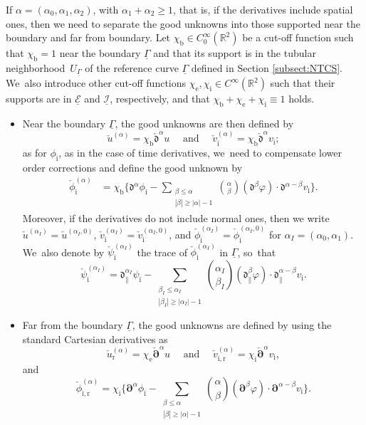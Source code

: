 \documentclass[11pt]{article}
\newcommand{\R}{{\mathbb R}}
\newcommand{\cI}{{\mathcal I}}
\newcommand{\cE}{{\mathcal E}}
\newcommand{\ul}[1]{\underline{#1}}
\newcommand{\itGamma}{\mathit{\Gamma}}
\newcommand{\cpalpha}{\check{\bm{\partial}}^{\alpha} }
\newcommand{\cmfalpha}{\check{\mathfrak{d}}^{\alpha}}
\theoremstyle{definition}
\begin{document}
If $\alpha=(\alpha_0,\alpha_1,\alpha_2)$, with $\alpha_1+\alpha_2\geq 1$, that is, if the derivatives include spatial ones,
then we need to separate the good unknowns into those supported near the boundary and far from boundary.
Let $\chi_\mathrm{b}\in C_0^\infty(\R^2)$ be a cut-off function such that $\chi_\mathrm{b}=1$ near the boundary $\ul{\itGamma}$ and that its support is in the
tubular neighborhood~$U_{\ul{\itGamma}}$ of the reference curve $\ul{\itGamma}$ defined in Section \ref{subsect:NTCS}. We~also introduce other cut-off functions $\chi_\mathrm{e},\chi_\mathrm{i}\in C^\infty(\R^2)$ such that their supports are in $\ul{\cE}$ and $\ul{\cI}$, respectively,
and that $\chi_\mathrm{b}+\chi_\mathrm{e}+\chi_\mathrm{i}\equiv1$ holds.
\begin{itemize}
\item
Near the boundary $\ul{\itGamma}$, the good unknowns are then defined by
\[
\check{u}^{(\alpha)} = \chi_\mathrm{b} \cmfalpha u
\quad\mbox{ and }\quad
\check{v}_\mathrm{i}^{(\alpha)} = \chi_\mathrm{b} \cmfalpha v_\mathrm{i};
\]
as for $\phi_\mathrm{i}$, as in the case of time derivatives, we~need to compensate lower order corrections and define the good unknown by
\begin{align*}
\check{\phi}_\mathrm{i}^{(\alpha)}
&= \chi_\mathrm{b} \biggl\{ \mathfrak{d}^{\alpha}\phi_\mathrm{i} - \sum_{\substack{\beta\leq\alpha\\ |\beta|\geq|\alpha|-1}} \binom{\alpha}{\beta}
(\mathfrak{d}^{\beta}\varphi)\cdot \mathfrak{d}^{\alpha-\beta}v_\mathrm{i} \biggr\}.
\end{align*}
Moreover, if the derivatives do not include normal ones, then we write $\check{u}^{(\alpha_I)}=\check{u}^{(\alpha_I,0)}$,
$\check{v}_\mathrm{i}^{(\alpha_I)}=\check{v}_\mathrm{i}^{(\alpha_I,0)}$,
and $\check{\phi}_\mathrm{i}^{(\alpha_I)}=\check{\phi}_\mathrm{i}^{(\alpha_I,0)}$ for $\alpha_I=(\alpha_0,\alpha_1)$. We~also denote by $\check\psi_\mathrm{i}^{(\alpha_{I})}$ the trace of $\check{\phi}_\mathrm{i}^{(\alpha_I)}$ in $\ul{\itGamma}$, so~that
\[
\check\psi_\mathrm{i}^{(\alpha_{I})}=\mathfrak{d}_\parallel^{\alpha_{I}}\psi_\mathrm{i} - \sum_{\substack{\beta_I\leq\alpha_I\\ |\beta_I|\geq|\alpha_I|-1}} \binom{\alpha_I}{\beta_I}
(\mathfrak{d}_\parallel^{\beta}\varphi)\cdot \mathfrak{d}_\parallel^{\alpha-\beta}v_\mathrm{i}.
\]
\item
Far from the boundary $\ul{\itGamma}$, the good unknowns are defined by using the standard Cartesian derivatives as
\[
\check{u}_\mathrm{r}^{(\alpha)} = \chi_\mathrm{e} \cpalpha u
\quad\mbox{ and }\quad
\check{v}_\mathrm{i,r}^{(\alpha)} = \chi_\mathrm{i}\cpalpha v_\mathrm{i},
\]
and
\[
\check{\phi}_\mathrm{i,r}^{(\alpha)}
= \chi_\mathrm{i} \biggl\{ \bm{\partial}^\alpha\phi_\mathrm{i} - \sum_{\substack{\beta\leq\alpha\\ |\beta|\geq|\alpha|-1}} \binom{\alpha}{\beta}
(\bm{\partial}^{\beta}\varphi)\cdot\bm{\partial}^{\alpha-\beta}v_\mathrm{i} \biggr\}.
\]
\end{itemize}
\end{document}
